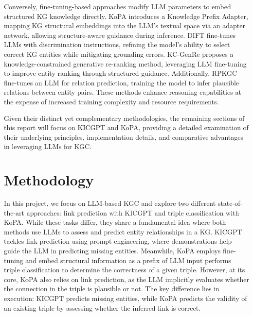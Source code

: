 \documentclass[12pt,a4paper]{article}
\begin{document}
Conversely, fine-tuning-based approaches modify LLM parameters to embed structured KG knowledge directly. KoPA \cite{qin2023kopa} introduces a Knowledge Prefix Adapter, mapping KG structural embeddings into the LLM's textual space via an adapter network, allowing structure-aware guidance during inference. DIFT \cite{liu2024dift} fine-tunes LLMs with discrimination instructions, refining the model's ability to select correct KG entities while mitigating grounding errors. KC-GenRe \cite{wang2024kcgenre} proposes a knowledge-constrained generative re-ranking method, leveraging LLM fine-tuning to improve entity ranking through structured guidance. Additionally, RPKGC \cite{khalil2024rpkgc} fine-tunes an LLM for relation prediction, training the model to infer plausible relations between entity pairs. These methods enhance reasoning capabilities at the expense of increased training complexity and resource requirements.

Given their distinct yet complementary methodologies, the remaining sections of this report will focus on KICGPT and KoPA, providing a detailed examination of their underlying principles, implementation details, and comparative advantages in leveraging LLMs for KGC.

%
%


\section{Methodology}\label{sec:methodology}

In this project, we focus on LLM-based KGC and explore two different
state-of-the-art approaches: link prediction with KICGPT
and triple classification with KoPA.
While these tasks differ, they share a fundamental idea where both
methods use LLMs to assess and predict entity relationships
in a KG. KICGPT tackles link prediction using prompt engineering,
where demonstrations help guide the LLM in predicting missing entities.
Meanwhile, KoPA employs fine-tuning and embed structural information
as a prefix of LLM input performs triple classification to determine the
correctness of a given triple. However, at its core, KoPA also relies
on link prediction, as the LLM implicitly evaluates whether the
connection in the triple is plausible or not. The key difference
lies in execution: KICGPT predicts missing entities, while KoPA
predicts the validity of an existing triple by assessing whether
the inferred link is correct.
\end{document}
